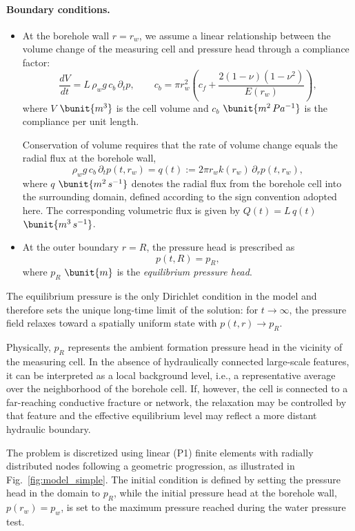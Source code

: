 \paragraph{Boundary conditions.}
\begin{itemize}
    \item At the borehole wall $r = r_w$, we assume a linear relationship
    between the volume change of the measuring cell and pressure head
    through a compliance factor:
    \[
        \frac{dV}{dt} = L\,\rho_w g\,c_b\,\partial_t p,
        \qquad
        c_b = \pi r_w^2 \left(
        c_f + \frac{2(1-\nu)(1-\nu^2)}{E(r_w)}
        \right),
    \]
    where $V$ $\bunit{m^3}$ is the cell volume and $c_b$ $\bunit{m^2\,Pa^{-1}}$ is the
    compliance per unit length.

    Conservation of volume requires that the rate of volume change equals the
    radial flux at the borehole wall,
    \[
        \rho_w g\,c_b\,\partial_t p(t,r_w)
        = q(t)
        := 2\pi r_w k(r_w)\,\partial_r p(t,r_w),
    \]
    where $q$ $\bunit{m^2\,s^{-1}}$ denotes the radial flux from the borehole cell
    into the surrounding domain, defined according to the sign convention
    adopted here. The corresponding volumetric flux is given by
    $Q(t) = L\,q(t)$ $\bunit{m^3\,s^{-1}}$.

    \item At the outer boundary $r = R$, the pressure head is prescribed as
    \[
        p(t,R) = p_R,
    \]
    where $p_R$ $\bunit{m}$ is the \emph{equilibrium pressure head}. 
  
\end{itemize}

The equilibrium pressure is the only Dirichlet condition in the model and therefore sets the
unique long-time limit of the solution: for $t \to \infty$, the pressure field
relaxes toward a spatially uniform state with $p(t,r) \to p_R$.

Physically, $p_R$ represents the ambient formation pressure head in the
vicinity of the measuring cell. In the absence of hydraulically connected
large-scale features, it can be interpreted as a local background level, i.e.,
a representative average over the neighborhood of the borehole cell. If,
however, the cell is connected to a far-reaching conductive fracture or
network, the relaxation may be controlled by that feature and the effective
equilibrium level may reflect a more distant hydraulic boundary.

The problem is discretized using linear (P1) finite elements with radially
distributed nodes following a geometric progression, as illustrated in
Fig.~\ref{fig:model_simple}. The initial condition is defined by setting the
pressure head in the domain to $p_R$, while the initial pressure head at the
borehole wall, $p(r_w)=p_w$, is set to the maximum pressure reached during the
water pressure test.

